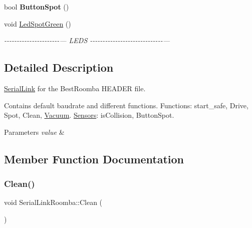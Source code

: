 \begin{DoxyCompactItemize}
\mbox{\label{class_serial_link_roomba_ae037dd67be9218ce68eedc54f9691e02}} 
bool {\bfseries Button\+Spot} ()
\item 
\mbox{\label{class_serial_link_roomba_a6045278b17864e9dfc2f2254da431159}} 
void \mbox{\hyperlink{class_serial_link_roomba_a6045278b17864e9dfc2f2254da431159}{Led\+Spot\+Green}} ()
\begin{DoxyCompactList}\small\item\em -\/-\/-\/-\/-\/-\/-\/-\/-\/-\/-\/-\/-\/-\/-\/-\/-\/-\/-\/-\/-\/-\/--- L\+E\+DS -\/-\/-\/-\/-\/-\/-\/-\/-\/-\/-\/-\/-\/-\/-\/-\/-\/-\/-\/-\/-\/-\/-\/-\/-\/-\/-\/-\/-\/--- \end{DoxyCompactList}\end{DoxyCompactItemize}


\subsection{Detailed Description}
\mbox{\hyperlink{class_serial_link}{Serial\+Link}} for the Best\+Roomba H\+E\+A\+D\+ER file. 

Contains default baudrate and different functions. Functions\+: start\+\_\+safe, Drive, Spot, Clean, \mbox{\hyperlink{class_vacuum}{Vacuum}}. \mbox{\hyperlink{class_sensors}{Sensors}}\+: is\+Collision, Button\+Spot. 
\begin{DoxyParams}{Parameters}
{\em value} & \\
\hline
\end{DoxyParams}


\subsection{Member Function Documentation}
\mbox{\label{class_serial_link_roomba_abb7f3a45935604914a96ea97cb7e6f59}} 
\subsubsection{\texorpdfstring{Clean()}{Clean()}}
{\footnotesize\ttfamily void Serial\+Link\+Roomba\+::\+Clean (\begin{DoxyParamCaption}{ }\end{DoxyParamCaption})\hspace{0.3cm}{\ttfamily [inline]}}

